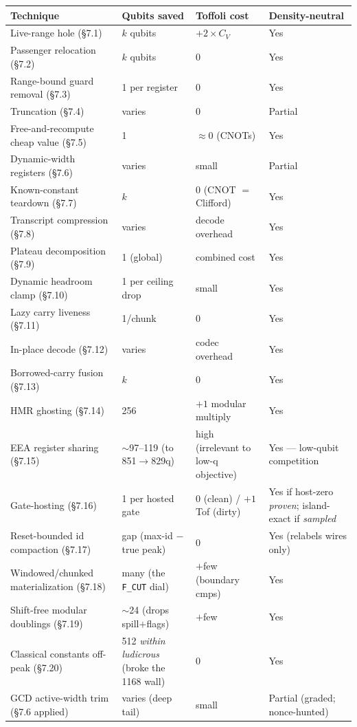\documentclass[11pt,a4paper]{article}
\begin{document}
\begin{center}
\small
\begin{tabular}{p{4.8cm}p{3cm}p{2.8cm}p{2.5cm}}
\toprule
\textbf{Technique} & \textbf{Qubits saved} & \textbf{Toffoli cost} & \textbf{Density-neutral} \\
\midrule
Live-range hole (\S7.1) & $k$ qubits & $+2 \times C_V$ & Yes \\
Passenger relocation (\S7.2) & $k$ qubits & 0 & Yes \\
Range-bound guard removal (\S7.3) & 1 per register & 0 & Yes \\
Truncation (\S7.4) & varies & 0 & Partial \\
Free-and-recompute cheap value (\S7.5) & 1 & $\approx0$ (CNOTs) & Yes \\
Dynamic-width registers (\S7.6) & varies & small & Partial \\
Known-constant teardown (\S7.7) & $k$ & 0 (CNOT $=$ Clifford) & Yes \\
Transcript compression (\S7.8) & varies & decode overhead & Yes \\
Plateau decomposition (\S7.9) & 1 (global) & combined cost & Yes \\
Dynamic headroom clamp (\S7.10) & 1 per ceiling drop & small & Yes \\
Lazy carry liveness (\S7.11) & 1/chunk & 0 & Yes \\
In-place decode (\S7.12) & varies & codec overhead & Yes \\
Borrowed-carry fusion (\S7.13) & $k$ & 0 & Yes \\
HMR ghosting (\S7.14) & 256 & $+1$ modular multiply & Yes \\
EEA register sharing (\S7.15) & $\sim$97--119 (to 851$\to$829q) & high (irrelevant to low-q objective) & Yes --- low-qubit competition \\
Gate-hosting (\S7.16) & 1 per hosted gate & 0 (clean) / $+1$ Tof (dirty) & Yes if host-zero \emph{proven}; island-exact if \emph{sampled} \\
Reset-bounded id compaction (\S7.17) & gap (max-id $-$ true peak) & 0 & Yes (relabels wires only) \\
Windowed/chunked materialization (\S7.18) & many (the \texttt{F\_CUT} dial) & $+$few (boundary cmps) & Yes \\
Shift-free modular doublings (\S7.19) & $\sim$24 (drops spill$+$flags) & $+$few & Yes \\
Classical constants off-peak (\S7.20) & 512 \emph{within ludicrous} (broke the 1168 wall) & 0 & Yes \\
GCD active-width trim (\S7.6 applied) & varies (deep tail) & small & Partial (graded; nonce-hunted) \\
\bottomrule
\end{tabular}
\end{center}
\end{document}

